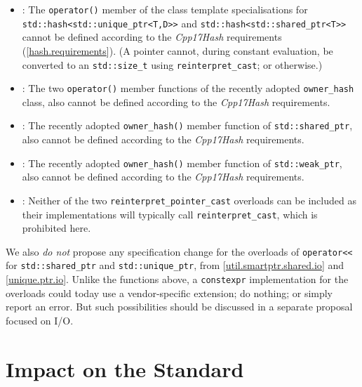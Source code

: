 \documentclass[10pt]{article}
\newcommand*{\wgxxi}[1]{[\href{https://wg21.link/#1}{#1}]}
\begin{document}
\begin{itemize}
  \item \wgxxi{util.smartptr.hash}: The \texttt{operator()} member of the class template specialisations for \linebreak \texttt{std::hash<std::unique\_ptr<T,D>>} and \texttt{std::hash<std::shared\_ptr<T>>} cannot be defined according to the \emph{Cpp17Hash} requirements (\wgxxi{hash.requirements}). (A pointer cannot, during constant evaluation, be converted to an \texttt{std::size\_t} using \texttt{reinterpret\_cast}; or otherwise.)

  \item \wgxxi{util.smartptr.owner.hash}: The two \texttt{operator()} member functions of the recently adopted \texttt{owner\_hash} class, also cannot be defined according to the \emph{Cpp17Hash} requirements.

  \item \wgxxi{util.smartptr.shared.obs}: The recently adopted \texttt{owner\_hash()} member function of \texttt{std::shared\_ptr}, also cannot be defined according to the \emph{Cpp17Hash} requirements.

  \item \wgxxi{util.smartptr.weak.obs}: The recently adopted \texttt{owner\_hash()} member function of \texttt{std::weak\_ptr}, also cannot be defined according to the \emph{Cpp17Hash} requirements.

  \item \wgxxi{util.smartptr.shared.cast}: Neither of the two \texttt{reinterpret\_pointer\_cast} overloads can be included as their implementations will typically call \texttt{reinterpret\_cast}, which is prohibited here.

\end{itemize}

We also \emph{do not} propose any specification change for the overloads of
\texttt{operator<<} for \texttt{std::shared\_ptr} and
\texttt{std::unique\_ptr}, from \wgxxi{util.smartptr.shared.io} and
\wgxxi{unique.ptr.io}. Unlike the functions above, a \texttt{constexpr}
implementation for the overloads could today use a vendor-specific extension;
do nothing; or simply report an error. But such possibilities should be
discussed in a separate proposal focused on I/O.

\section{Impact on the Standard}
\end{document}
